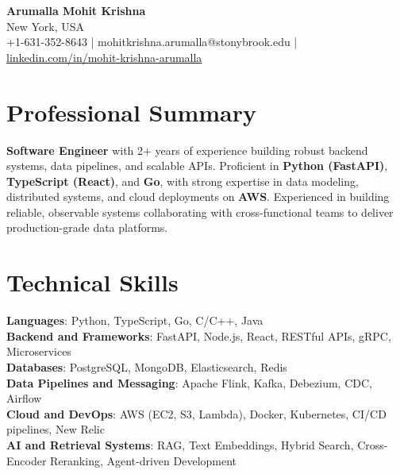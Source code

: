 \documentclass[letterpaper,11pt]{article}
\begin{document}
\begin{center}
  {\Large \textbf{Arumalla Mohit Krishna}} \\
  New York, USA \\
  +1-631-352-8643 \enspace | \enspace mohitkrishna.arumalla@stonybrook.edu \enspace | \enspace \href{https://www.linkedin.com/in/mohit-krishna-arumalla}{linkedin.com/in/mohit-krishna-arumalla}
\end{center}

\section{Professional Summary}
  \begin{itemize}[leftmargin=0.15in, label={}]
    \small{\item{
     \textbf{Software Engineer} with 2+ years of experience building robust backend systems, data pipelines, and scalable APIs. Proficient in \textbf{Python (FastAPI)}, \textbf{TypeScript (React)}, and \textbf{Go}, with strong expertise in data modeling, distributed systems, and cloud deployments on \textbf{AWS}. Experienced in building reliable, observable systems collaborating with cross-functional teams to deliver production-grade data platforms.
    }}
  \end{itemize}
\vspace{-16pt}

\section{Technical Skills}
 \begin{itemize}[leftmargin=0.15in, label={}]
    \small{\item{
     \textbf{Languages}: Python, TypeScript, Go, C/C++, Java \\
     \textbf{Backend and Frameworks}: FastAPI, Node.js, React, RESTful APIs, gRPC, Microservices \\
     \textbf{Databases}: PostgreSQL, MongoDB, Elasticsearch, Redis \\
     \textbf{Data Pipelines and Messaging}: Apache Flink, Kafka, Debezium, CDC, Airflow \\
     \textbf{Cloud and DevOps}: AWS (EC2, S3, Lambda), Docker, Kubernetes, CI/CD pipelines, New Relic \\
     \textbf{AI and Retrieval Systems}: RAG, Text Embeddings, Hybrid Search, Cross-Encoder Reranking, Agent-driven Development
    }}
 \end{itemize}
\vspace{-16pt}
\end{document}
